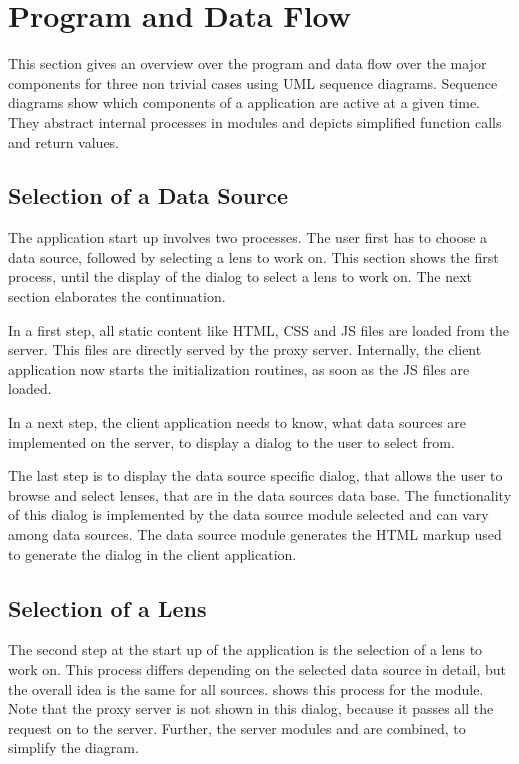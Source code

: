 \section{Program and Data Flow}
\label{sec:pd_flow}

This section gives an overview over the program and data flow over the major components for three non trivial cases using UML sequence diagrams.
Sequence diagrams show which components of a application are active at a given time.
They abstract internal processes in modules and depicts simplified function calls and return values.



\subsection{Selection of a Data Source}

The application start up involves two processes.
The user first has to choose a data source, followed by selecting a lens to work on.
This section shows the first process, until the display of the dialog to select a lens to work on.
The next section elaborates the continuation.

In a first step, all static content like HTML, CSS and JS files are loaded from the server.
This files are directly served by the proxy server.
Internally, the client application now starts the initialization routines, as soon as the JS files are loaded.

In a next step, the client application needs to know, what data sources are implemented on the server, to display a dialog to the user to select from.

The last step is to display the data source specific dialog, that allows the user to browse and select lenses, that are in the data sources data base.
The functionality of this dialog is implemented by the data source module selected and can vary among data sources.
The data source module generates the HTML markup used to generate the dialog in the client application.



\subsection{Selection of a Lens}

The second step at the start up of the application is the selection of a lens to work on.
This process differs depending on the selected data source in detail, but the overall idea is the same for all sources.
 shows this process for the \sw module.
Note that the proxy server is not shown in this dialog, because it passes all the request on to the server.
Further, the server modules  and  are combined, to simplify the diagram.

